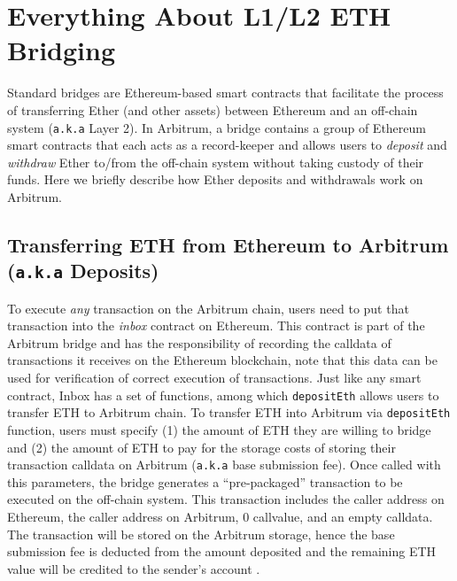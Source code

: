 


\section{Everything About L1/L2 ETH Bridging}\label{sec:bridge}
Standard bridges are Ethereum-based smart contracts that facilitate the process of transferring Ether (and other assets) between Ethereum and an off-chain system (\texttt{a.k.a} Layer 2). In Arbitrum, a bridge contains a group of Ethereum smart contracts that each acts as a record-keeper and allows users to \textit{deposit} and \textit{withdraw} Ether to/from the off-chain system without taking custody of their funds. Here we briefly describe how Ether deposits and withdrawals work on Arbitrum.


\subsection{Transferring ETH from Ethereum to Arbitrum (\texttt{a.k.a} Deposits)}

To execute \textit{any} transaction on the Arbitrum chain, users need to put that transaction into the \textit{inbox} contract on Ethereum. This contract is part of the Arbitrum bridge and has the responsibility of recording the calldata of transactions it receives on the Ethereum blockchain, note that this data can be used for verification of correct execution of transactions. Just like any smart contract, Inbox has a set of functions, among which \texttt{depositEth} allows users to transfer ETH to Arbitrum chain. To transfer ETH into Arbitrum via \texttt{depositEth} function, users must specify (1) the amount of  ETH they are willing to bridge and (2) the amount of ETH to pay for the storage costs of storing their transaction calldata on Arbitrum (\texttt{a.k.a} base submission fee). Once called with this parameters, the bridge generates a “pre-packaged” transaction to be executed on the off-chain system. This transaction includes the caller address on Ethereum, the caller address on Arbitrum, 0 callvalue, and an empty calldata. The transaction will be stored on the Arbitrum storage, hence the base submission fee is deducted from the amount deposited and the remaining ETH value will be credited to the sender’s account .





